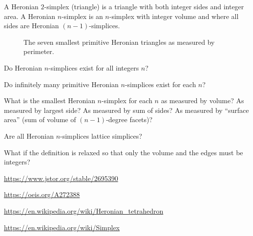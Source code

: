 \documentclass{article}
\begin{document}
A Heronian $2$-simplex (triangle) is a triangle with both integer sides and
integer area. A Heronian $n$-simplex is an $n$-simplex with integer volume and
where all sides are Heronian $(n - 1)$-simplices.
\begin{figure}[ht!]
  \centering
  \caption{
    The seven smallest primitive Heronian triangles as measured by perimeter.
  }
\end{figure}
\begin{question}
  Do Heronian $n$-simplices exist for all integers $n$?
\end{question}

\begin{related}
  \item Do infinitely many primitive Heronian $n$-simplices exist for each $n$?
  \item What is the smallest Heronian $n$-simplex for each $n$ as measured by
    volume? As measured by largest side? As measured by sum of sides?
    As measured by ``surface area'' (sum of volume of $(n-1)$-degree facets)?
  \item Are all Heronian $n$-simplices lattice simplices?
  \item What if the definition is relaxed so that only the volume and the
    edges must be integers?
\end{related}
\begin{references}
  \item \url{https://www.jstor.org/stable/2695390}
  \item \url{https://oeis.org/A272388}
  \item \url{https://en.wikipedia.org/wiki/Heronian_tetrahedron}
  \item \url{https://en.wikipedia.org/wiki/Simplex}
\end{references}
\end{document}
